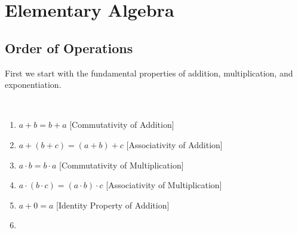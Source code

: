 \documentclass[crop=false,class=article,oneside]{standalone}
\begin{document}
    \ifx\ifmathcourseselementaryalgebra\undefined
        \section*{Elementary Algebra}
        \setcounter{section}{1}
    \fi
    \subsection{Order of Operations}
        First we start with the fundamental properties of
        addition, multiplication, and exponentiation.
        \begin{properties}
            \label{property:North_Shore_Arithmetic_Properties}
            \
            \begin{enumerate}
                \item
                    \label{%
                        property:%
                        North_Shore_Arithmetic_Properties_%
                        Com_Add%
                    }
                    $a+b=b+a$\hfill
                    [Commutativity of Addition]
                \item
                    \label{
                        property:%
                        north_shore_arithmetic_properties_%
                        assoc_add%
                    }
                    $a+(b+c)=(a+b)+c$\hfill
                    [Associativity of Addition]
                \item
                    \label{%
                        property:%
                        north_shore_arithmetic_properties_%
                        comm_mult%
                    }
                    ${a}\cdot{b}={b}\cdot{a}$\hfill
                    [Commutativity of Multiplication]
                \item
                    \label{%
                        property:%
                        north_shore_arithmetic_properties_%
                        assoc_mult%
                    }
                    ${a}\cdot{({b}\cdot{c})}%
                     ={({a}\cdot{b})}\cdot{c}$\hfill
                    [Associativity of Multiplication]
                \item
                    \label{%
                        property:%
                        north_shore_arithmetic_properties_%
                        add_identity
                    }
                    $a+0=a$\hfill%
                    [Identity Property of Addition]
                \item

\end{enumerate}
\end{properties}
\end{document}
